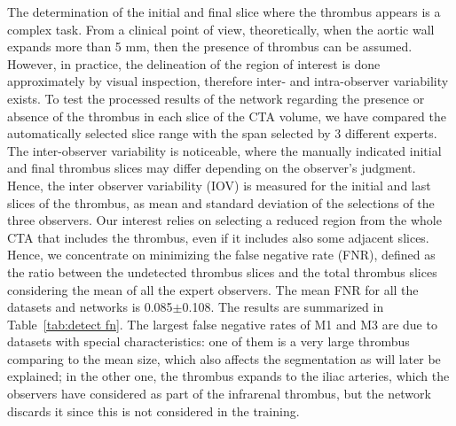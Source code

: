 \documentclass[preprint,authoryear,12pt]{elsarticle}
\begin{document}
The determination of the initial and final slice where the thrombus appears is a complex task.  From a clinical point of view, theoretically, when the aortic wall expands more than 5 mm, then the presence of thrombus can be assumed. However, in practice, the delineation of the region of interest is done approximately by visual inspection, therefore inter- and intra-observer variability exists. %
To test the processed results of the network regarding the presence or absence of the thrombus in each slice of the CTA volume, we have compared the automatically selected slice range with the span selected by 3 different experts. The inter-observer variability is noticeable, where the manually indicated initial and final thrombus slices may differ depending on the observer's judgment. Hence, the inter observer variability (IOV) is measured for the initial and last slices of the thrombus, as mean and standard deviation of the selections of the three observers. Our interest relies on selecting a reduced region from the whole CTA that includes the thrombus, even if it includes also some adjacent slices. Hence, we concentrate on minimizing the false negative rate (FNR), defined as the ratio between the undetected thrombus slices and the total thrombus slices considering the mean of all the expert observers. The mean FNR for all the datasets and networks is 0.085\(\pm\)0.108. The results are summarized in %
Table~\ref{tab:detect fn}. The largest false negative rates of M1 and M3 are due to datasets with special characteristics: one of them is a very large thrombus comparing to the mean size, which also affects the segmentation as will later be explained; in the other one, the thrombus expands to the iliac arteries, which the observers have considered as part of the infrarenal thrombus, but the network discards it since this is not considered in the training.  %
\end{document}
